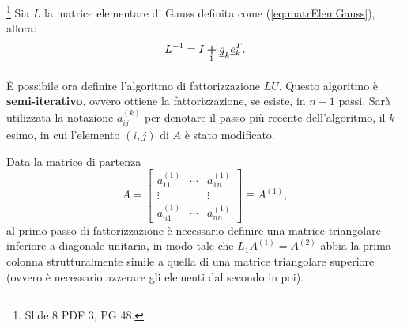 \addtocounter{footnote}{-3}




\begin{theorem}\footnote{Slide 8 PDF 3, PG 48.}
    Sia $L$ la matrice elementare di Gauss definita come (\ref{eq:matrElemGauss}), allora:
    \begin{equation}
        L^{-1}=I\underset{\footnotemark}{\boldsymbol +}\uline g_k\uline e_k^T.
    \end{equation}
\end{theorem}

È possibile ora definire l'algoritmo di fattorizzazione $LU$. Questo algoritmo è \textbf{semi-iterativo}, ovvero ottiene la fattorizzazione, se esiste, in $n-1$ passi. Sarà utilizzata la notazione $a_{ij}^{(k)}$ per denotare il passo più recente dell'algoritmo, il $k$-esimo, in cui l'elemento $(i,j)$ di $A$ è stato modificato.

Data la matrice di partenza
\begin{equation}\label{eq:A1}
    A=\begin{bmatrix}
        a_{11}^{(1)} & \cdots & a_{1n}^{(1)}\\
        \vdots & & \vdots\\
        a_{n1}^{(1)}&\cdots & a_{nn}^{(1)}
    \end{bmatrix}\equiv A^{(1)},
\end{equation}
al primo passo di fattorizzazione è necessario definire una matrice triangolare inferiore a diagonale unitaria, in modo tale che $L_1 A^{(1)}=A^{(2)}$ abbia la prima colonna strutturalmente simile a quella di una matrice triangolare superiore (ovvero è necessario azzerare gli elementi dal secondo in poi).

